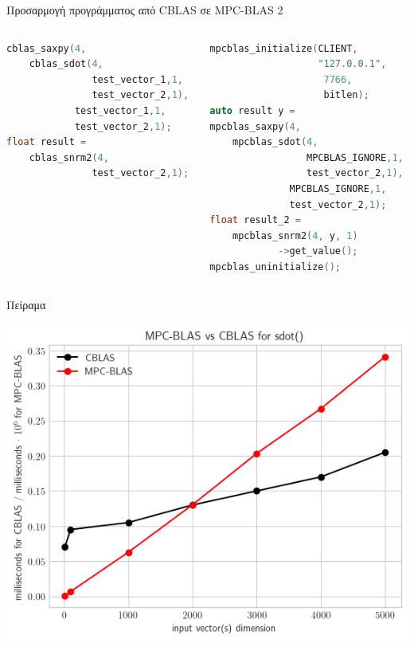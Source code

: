 \documentclass[10pt]{beamer}
\begin{document}
    \begin{frame}[fragile]{Προσαρμογή προγράμματος από CBLAS σε MPC-BLAS 2}
        \begin{columns}[c]
            \begin{column}{.48\textwidth}
                \begin{block}{}
                    \begin{lstlisting}[firstnumber=1, label=glabels, xleftmargin=5pt, basicstyle=\footnotesize, language=C++]
cblas_saxpy(4,
    cblas_sdot(4,
               test_vector_1,1,
               test_vector_2,1),
            test_vector_1,1,
            test_vector_2,1);
float result =
    cblas_snrm2(4,
               test_vector_2,1);
                    \end{lstlisting}
                \end{block}
            \end{column}
            \hfill
            \begin{column}{.48\textwidth}
                \begin{block}{}
                    \begin{lstlisting}[firstnumber=1, label=glabels, xleftmargin=5pt, basicstyle=\footnotesize, language=C++]
mpcblas_initialize(CLIENT,
                   "127.0.0.1",
                    7766,
                    bitlen);
auto result y =
mpcblas_saxpy(4,
    mpcblas_sdot(4,
                 MPCBLAS_IGNORE,1,
                 test_vector_2,1),
              MPCBLAS_IGNORE,1,
              test_vector_2,1);
float result_2 =
    mpcblas_snrm2(4, y, 1)
            ->get_value();
mpcblas_uninitialize();
                    \end{lstlisting}
                \end{block}
            \end{column}%
        \end{columns}
    \end{frame}

    \begin{frame}[fragile, c]{Πείραμα}
        \begin{center}
            \includegraphics[scale=0.7]{./images/mpc-blas-timings-graph}
        \end{center}
    \end{frame}
\end{document}
